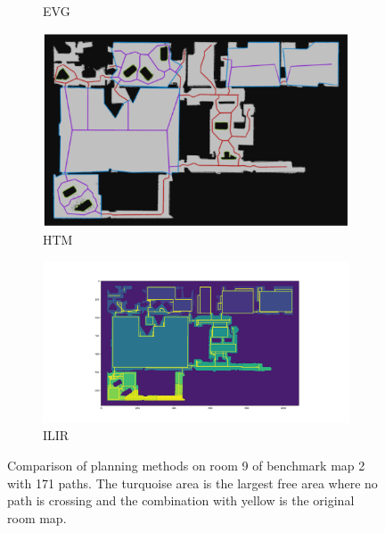 \begin{figure}[h]
\begin{subfigure}{.5\textwidth}
      \caption{EVG}
    \end{subfigure}
    \begin{subfigure}{.5\textwidth}
      \centering
      \includegraphics[width=\textwidth]{figures/60_results/hou2_roadmap_htm.png}
      \caption{HTM}
    \end{subfigure}%
    \begin{subfigure}{.5\textwidth}
      \centering
      \includegraphics[width=\textwidth]{figures/60_results/hou2_roadmap_ilir.png}
      \caption{ILIR}
    \end{subfigure}
    \caption[Comparison of planning methods on room 9 of benchmark map 2 with 171 paths]{Comparison of planning methods on room 9 of benchmark map 2 with 171 paths. The turquoise area is the largest free area where no path is crossing and the combination with yellow is the original room map.}
    \label{fig:hou_comparison}
\end{figure}

